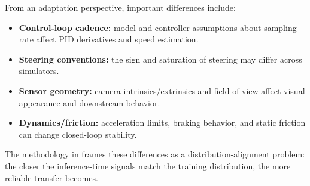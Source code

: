 From an adaptation perspective, important differences include:
\begin{itemize}[leftmargin=*,itemsep=0.25em]
  \item \textbf{Control-loop cadence:} model and controller assumptions about sampling rate affect PID derivatives and speed estimation.
  \item \textbf{Steering conventions:} the sign and saturation of steering may differ across simulators.
  \item \textbf{Sensor geometry:} camera intrinsics/extrinsics and field-of-view affect visual appearance and downstream behavior.
  \item \textbf{Dynamics/friction:} acceleration limits, braking behavior, and static friction can change closed-loop stability.
\end{itemize}

The methodology in  frames these differences as a distribution-alignment problem: the closer the inference-time signals match the training distribution, the more reliable transfer becomes.
